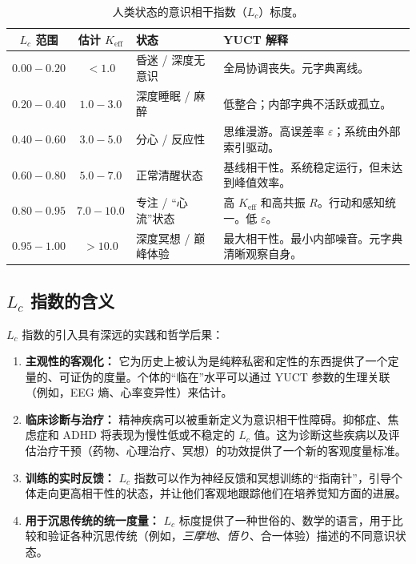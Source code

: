 \documentclass[12pt,a4paper]{article}
\begin{document}
	\begin{table}[H]
		\centering
		\caption{人类状态的意识相干指数（\(L_c\)）标度。}
		\label{tab:Lc-scale}
		\begin{tabular}{c c l p{6cm}}
			\toprule
			\textbf{\(L_c\) 范围} & \textbf{估计 \(K_{\mathrm{eff}}\)} & \textbf{状态} & \textbf{YUCT 解释} \\
			\midrule
			\(0.00 - 0.20\) & \(< 1.0\) & 昏迷 / 深度无意识 & 全局协调丧失。元字典离线。 \\
			\(0.20 - 0.40\) & \(1.0 - 3.0\) & 深度睡眠 / 麻醉 & 低整合；内部字典不活跃或孤立。 \\
			\(0.40 - 0.60\) & \(3.0 - 5.0\) & 分心 / 反应性 & 思维漫游。高误差率 \(\varepsilon\)；系统由外部索引驱动。 \\
			\(0.60 - 0.80\) & \(5.0 - 7.0\) & 正常清醒状态 & 基线相干性。系统稳定运行，但未达到峰值效率。 \\
			\(0.80 - 0.95\) & \(7.0 - 10.0\) & 专注 / “心流”状态 & 高 \(K_{\mathrm{eff}}\) 和高共振 \(R\)。行动和感知统一。低 \(\varepsilon\)。 \\
			\(0.95 - 1.00\) & \(> 10.0\) & 深度冥想 / 巅峰体验 & 最大相干性。最小内部噪音。元字典清晰观察自身。 \\
			\bottomrule
		\end{tabular}
	\end{table}
	
	\subsection{\(L_c\) 指数的含义}
	
	\(L_c\) 指数的引入具有深远的实践和哲学后果：
	
	\begin{enumerate}
		\item \textbf{主观性的客观化：} 它为历史上被认为是纯粹私密和定性的东西提供了一个定量的、可证伪的度量。个体的“临在”水平可以通过 YUCT 参数的生理关联（例如，EEG 熵、心率变异性）来估计。
		\item \textbf{临床诊断与治疗：} 精神疾病可以被重新定义为意识相干性障碍。抑郁症、焦虑症和 ADHD 将表现为慢性低或不稳定的 \(L_c\) 值。这为诊断这些疾病以及评估治疗干预（药物、心理治疗、冥想）的功效提供了一个新的客观度量标准。
		\item \textbf{训练的实时反馈：} \(L_c\) 指数可以作为神经反馈和冥想训练的“指南针”，引导个体走向更高相干性的状态，并让他们客观地跟踪他们在培养觉知方面的进展。
		\item \textbf{用于沉思传统的统一度量：} \(L_c\) 标度提供了一种世俗的、数学的语言，用于比较和验证各种沉思传统（例如，\textit{三摩地}、\textit{悟り}、合一体验）描述的不同意识状态。
	\end{enumerate}
	
\end{document}
